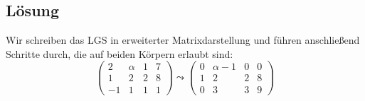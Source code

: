 \subsection{Lösung}
Wir schreiben das LGS in erweiterter Matrixdarstellung und führen anschließend Schritte durch, die auf beiden Körpern erlaubt sind:
\begin{equation*}
	\left( \begin{array}{ccc|c}
		2 & \alpha & 1 & 7 \\
		1 & 2 & 2 & 8 \\
		-1 & 1 & 1 & 1
	\end{array} \right) \leadsto \left( \begin{array}{ccc|c}
		0 & \alpha-1 & 0 & 0 \\
		1 & 2 & 2 & 8 \\
		0 & 3 & 3 & 9
	\end{array} \right)
\end{equation*}
